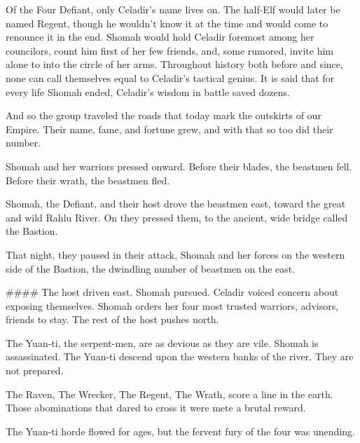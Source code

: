 Of the Four Defiant, only Celadir's name lives on.
The half-Elf would later be named Regent, though he wouldn't know it at the time
  and would come to renounce it in the end.
Shomah would hold Celadir foremost among her councilors,
  count him first of her few friends,
  and, some rumored, invite him alone to into the circle of her arms.
Throughout history both before and since, none can call themselves equal
  to Celadir's tactical genius.
It is said that for every life Shomah ended, Celadir's wisdom in battle saved dozens.

\hrulefill

And so the group traveled the roads that today mark the outskirts of our Empire.
Their name, fame, and fortune grew, and with that so too did their number.

Shomah and her warriors pressed onward.
Before their blades, the beastmen fell.
Before their wrath, the beastmen fled.

Shomah, the Defiant, and their host drove the beastmen east,
  toward the great and wild Rahlu River.
On they pressed them, to the ancient, wide bridge called the Bastion.

That night, they paused in their attack, Shomah and her forces on the western side of the Bastion,
  the dwindling number of beastmen on the east.



####
The host driven east.
Shomah pursued.
Celadir voiced concern about exposing themselves.
Shomah orders her four most trusted warriors, advisors, friends to stay.
The rest of the host pushes north.

The Yuan-ti, the serpent-men, are as devious as they are vile.
Shomah is assassinated.
The Yuan-ti descend upon the western banks of the river.
They are not prepared.

The Raven, The Wrecker, The Regent, The Wrath, score a line in the earth.
Those abominations that dared to cross it were mete a brutal reward.

The Yuan-ti horde flowed for ages, but the fervent fury of the four was unending.
